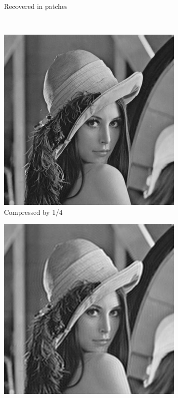 \documentclass{article}
\begin{document}
\begin{figure}[htb!]
\begin{subfigure}[t]{0.25\textwidth}
			\caption{\label{fig:lena-patch-recover}Recovered in patches}
		\end{subfigure}
		\\
		\begin{subfigure}[t]{0.25\textwidth}
			\centering
			\includegraphics[width=\textwidth]{img/lena_compress_4.jpg}
			\caption{\label{fig:lena-compress-4}Compressed by 1/4}
		\end{subfigure}
		\hfill
		\begin{subfigure}[t]{0.25\textwidth}
			\centering
			\includegraphics[width=\textwidth]{img/lena_compress_16.jpg}

\end{subfigure}
\end{figure}
\end{document}
